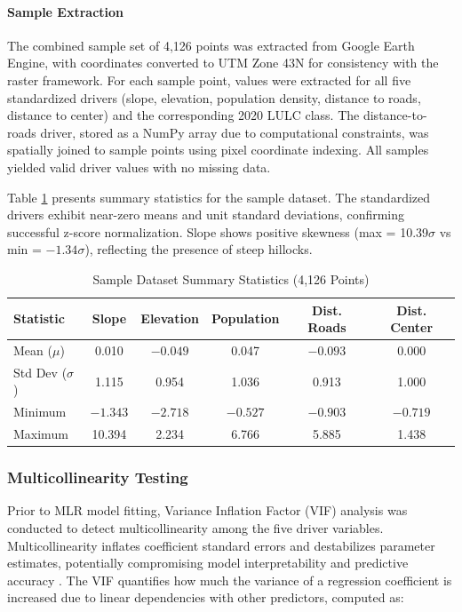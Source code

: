 \documentclass[12pt,a4paper]{article}
\begin{document}
\paragraph{Sample Extraction}
The combined sample set of 4,126 points was extracted from Google Earth Engine, with coordinates converted to UTM Zone 43N for consistency with the raster framework. For each sample point, values were extracted for all five standardized drivers (slope, elevation, population density, distance to roads, distance to center) and the corresponding 2020 LULC class. The distance-to-roads driver, stored as a NumPy array due to computational constraints, was spatially joined to sample points using pixel coordinate indexing. All samples yielded valid driver values with no missing data.

Table \ref{tab:sample_summary} presents summary statistics for the sample dataset. The standardized drivers exhibit near-zero means and unit standard deviations, confirming successful z-score normalization. Slope shows positive skewness (max = 10.39$\sigma$ vs min = $-1.34\sigma$), reflecting the presence of steep hillocks.

\begin{table}[H]
\caption{Sample Dataset Summary Statistics (4,126 Points)}
\label{tab:sample_summary}
\centering
\small
\renewcommand{\arraystretch}{1.1}
\begin{tabular}{lccccc}
\toprule
\textbf{Statistic} & \textbf{Slope} & \textbf{Elevation} & \textbf{Population} & \textbf{Dist. Roads} & \textbf{Dist. Center} \\
\midrule
Mean ($\mu$) & 0.010 & $-0.049$ & 0.047 & $-0.093$ & 0.000 \\
Std Dev ($\sigma$) & 1.115 & 0.954 & 1.036 & 0.913 & 1.000 \\
Minimum & $-1.343$ & $-2.718$ & $-0.527$ & $-0.903$ & $-0.719$ \\
Maximum & 10.394 & 2.234 & 6.766 & 5.885 & 1.438 \\
\bottomrule
\end{tabular}
\end{table}

\subsubsection{Multicollinearity Testing}

Prior to MLR model fitting, Variance Inflation Factor (VIF) analysis was conducted to detect multicollinearity among the five driver variables. Multicollinearity inflates coefficient standard errors and destabilizes parameter estimates, potentially compromising model interpretability and predictive accuracy . The VIF quantifies how much the variance of a regression coefficient is increased due to linear dependencies with other predictors, computed as:
\end{document}
